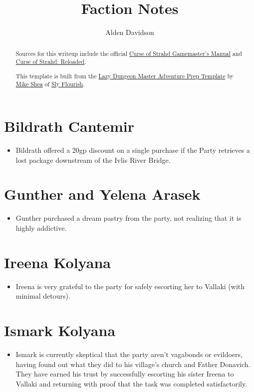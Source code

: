 \documentclass[a4paper,11pt]{article}
\title{Faction Notes}
\author{Alden Davidson}
\begin{document}
\maketitle
\tableofcontents

\begin{abstract}
  Sources for this writeup include the official
  \href{https://5e.tools/adventure.html#cos}{Curse of Strahd Gamemaster's Manual} and
  \href{https://www.reddit.com/r/CurseofStrahd/comments/9bpzbh/curse_of_strahd_reloaded_compilation_thread/}{Curse of Strahd: Reloaded}.
  
  This template is built from the
  \href{https://slyflourish.com/rotldm_template.html}{Lazy Dungeon Master Adventure Prep Template} by
  \href{https://slyflourish.com/about_mike_shea.html}{Mike Shea} of \href{https://slyflourish.com/}{Sly Flourish}.
\end{abstract}

\pagebreak
\section{Bildrath Cantemir}
\begin{itemize}
  \item Bildrath offered a 20gp discount on a single purchase if the Party retrieves a lost package downstream of
  the Ivlis River Bridge.
\end{itemize}

\section{Gunther and Yelena Arasek}
\begin{itemize}
  \item Gunther purchased a dream pastry from the party, not realizing that it is highly addictive.
\end{itemize}

\section{Ireena Kolyana}
\begin{itemize}
  \item Ireena is very grateful to the party for safely escorting her to Vallaki (with minimal detours).
\end{itemize}

\section{Ismark Kolyana}
\begin{itemize}
  \item Ismark is currently skeptical that the party aren't vagabonds or evildoers, having found out what they did
  to his village's church and Father Donavich. They have earned his trust by successfully escorting his sister 
  Ireena to Vallaki and returning with proof that the task was completed satisfactorily.
\end{itemize}
\end{document}
